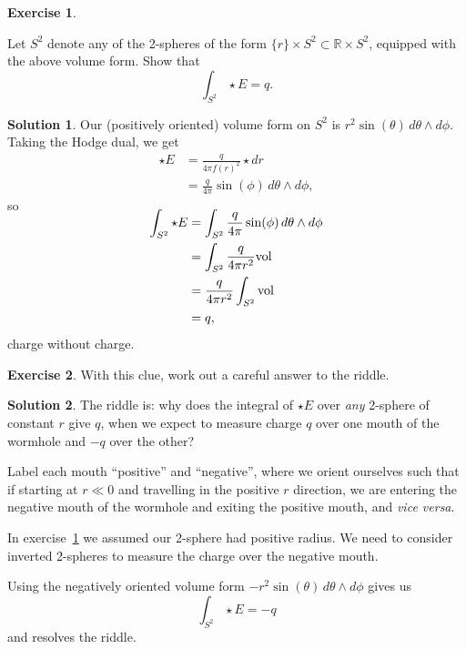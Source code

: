 \documentclass[11pt, a4paper]{report}
\theoremstyle{definition}
\newtheorem{ex}{Exercise}[part]
\newtheorem{sol}{Solution}[part]
\begin{document}
\begin{ex}\label{ex:chargewithoutcharge}

Let $S^2$ denote any of the 2-spheres of the form $\{r\} \times S^2 \subset \mathbb{R} \times S^2$, equipped with the above volume form. Show that
\[
    \int_{S^2} \star E = q.
\]

\end{ex}

\begin{sol}

Our (positively oriented) volume form on $S^2$ is $r^2 \sin(\theta) \, d\theta \wedge d\phi$.
Taking the Hodge dual, we get
\begin{align*}
    \star E &= \frac{q}{4 \pi {f(r)}^2} \star dr \\
            &= \frac{q}{4 \pi} \sin(\phi) \, d\theta \wedge d\phi,
\end{align*}
so
\begin{align*}
    \SwapAboveDisplaySkip
    \int_{S^2} \star E &= \int_{S^2} \frac{q}{4 \pi} \sin(\phi) \, d\theta \wedge d\phi \\
        &= \int_{S^2} \frac{q}{4 \pi r^2} \text{vol} \\
        &= \frac{q}{4 \pi r^2} \int_{S^2} \text{vol} \\
        &= q,
\end{align*}
charge without charge.

\end{sol}

\begin{ex}

With this clue, work out a careful answer to the riddle.

\end{ex}

\begin{sol}

The riddle is: why does the integral of $\star E$ over \emph{any} 2-sphere of constant $r$ give $q$, when we expect to measure charge $q$ over  one mouth of the wormhole and $-q$ over the other?

Label each mouth ``positive'' and ``negative'', where we orient ourselves such that if starting at $r \ll 0$ and travelling in the positive $r$ direction, we are entering the negative mouth of the wormhole and exiting the positive mouth, and \emph{vice versa}.

In exercise~\ref{ex:chargewithoutcharge} we assumed our 2-sphere had positive radius.
We need to consider inverted 2-spheres to measure the charge over the negative mouth.

Using the negatively oriented volume form $-r^2 \sin(\theta) \, d\theta \wedge d\phi$ gives us
\[
    \int_{S^2} \star E = -q
\]
and resolves the riddle.

\end{sol}
\end{document}
